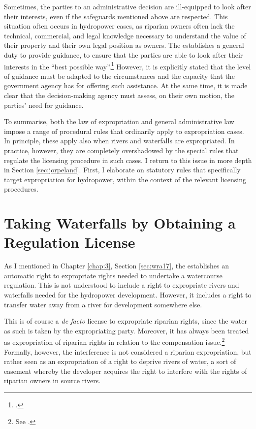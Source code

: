 Sometimes, the parties to an administrative decision are ill-equipped to look after their interests, even if the safeguards mentioned above are respected. This situation often occurs in hydropower cases, as riparian owners often lack the technical, commercial, and legal knowledge necessary to understand the value of their property and their own legal position as owners. The \cite{paa67} establishes a general duty to provide guidance, to ensure that the parties are able to look after their interests in the ``best possible way''.\footcite[11]{paa67} However, it is explicitly stated that the level of guidance must be adapted to the circumstances and the capacity that the government agency has for offering such assistance. At the same time, it is made clear that the decision-making agency must assess, on their own motion, the parties' need for guidance.

To summarise, both the law of expropriation and general administrative law impose a range of procedural rules that ordinarily apply to expropriation cases. In principle, these apply also when rivers and waterfalls are expropriated. In practice, however, they are completely overshadowed by the special rules that regulate the licensing procedure in such cases. I return to this issue in more depth in Section \ref{sec:jorpeland}. First, I elaborate on statutory rules that specifically target expropriation for hydropower, within the context of the relevant licensing procedures.

\section{Taking Waterfalls by Obtaining a Regulation License}\label{sec:special}

As I mentioned in Chapter \ref{chap:3}, Section \ref{sec:wra17}, the \cite{wra17} establishes an automatic right to expropriate rights needed to undertake a watercourse regulation. This is not understood to include a right to expropriate rivers and waterfalls needed for the hydropower development. However, it includes a right to transfer water away from a river for development somewhere else. 

This is of course a {\it de facto} license to expropriate riparian rights, since the water as such is taken by the expropriating party. Moreover, it has always been treated as expropriation of riparian rights in relation to the compensation issue.\footnote{See \cite{jorpeland11}.} Formally, however, the interference is not considered a riparian expropriation, but rather seen as an expropriation of a right to deprive rivers of water, a sort of easement whereby the developer acquires the right to interfere with the rights of riparian owners in source rivers.

